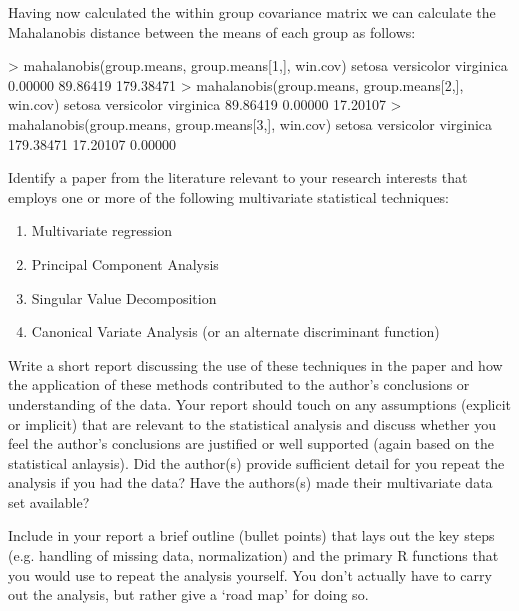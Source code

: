 Having now calculated the within group covariance matrix we can calculate the Mahalanobis distance between the means of each group as follows:

\begin{R}
> mahalanobis(group.means, group.means[1,], win.cov)
    setosa versicolor  virginica 
   0.00000   89.86419  179.38471 
> mahalanobis(group.means, group.means[2,], win.cov)
    setosa versicolor  virginica 
  89.86419    0.00000   17.20107 
> mahalanobis(group.means, group.means[3,], win.cov)
    setosa versicolor  virginica 
 179.38471   17.20107    0.00000 
\end{R}

\medskip
\begin{assignment}
\small

Identify a paper from the literature relevant to your research interests that employs one or more of the following multivariate statistical techniques:

\begin{enumerate}
\item Multivariate regression
\item Principal Component Analysis
\item Singular Value Decomposition
\item Canonical Variate Analysis (or an alternate discriminant function)
\end{enumerate}

Write a short report discussing the use of these techniques in the paper and how the application of these methods contributed to the author's conclusions or understanding of the data.  Your report should touch on any assumptions (explicit or implicit) that are relevant to the statistical analysis and discuss whether you feel the author's conclusions are justified or well supported (again based on the statistical anlaysis).  Did the author(s) provide sufficient detail for you repeat the analysis if you had the data?  Have the authors(s) made their multivariate data set available?

\medskip
Include in your report a brief outline (bullet points) that lays out the key steps (e.g. handling of missing data, normalization) and the primary R functions that you would use to repeat the analysis yourself. You don't actually have to carry out the analysis, but rather give a `road map' for doing so.


\end{assignment}


